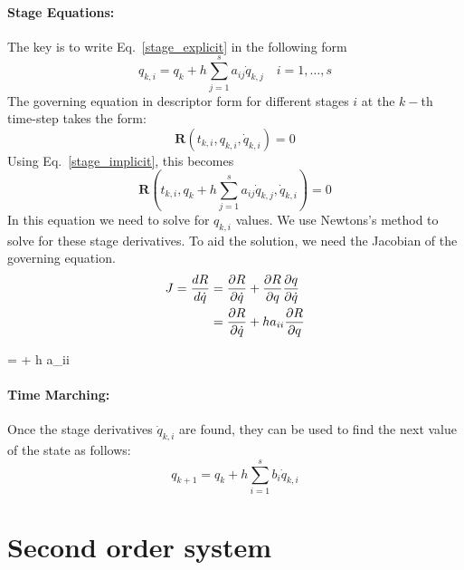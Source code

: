 \documentclass[pdftex,11pt,letter]{article}
\begin{document}
\paragraph{Stage Equations:}
The key is to write Eq.~\ref{stage_explicit} in the following form
\begin{equation}\label{stage_implicit}
  q_{k,i} = q_{k} + h \sum_{j=1}^s a_{ij} \dot{q}_{k,j} \quad i = 1,\ldots,s 
\end{equation}
The governing equation in descriptor form for different stages $i$ at the $k-$th time-step takes the form:
\begin{equation}
  \mathbf{R}\left(t_{k,i}, q_{k,i}, \dot{q}_{k,i}\right) = 0
\end{equation}
Using Eq.~\eqref{stage_implicit}, this becomes
\begin{equation}
  \mathbf{R}\left(t_{k,i}, q_k + h \sum_{j=1}^s a_{ij}\dot{q}_{k,j}, \dot{q}_{k,i}\right) = 0
\end{equation}
In this equation we need to solve for $q_{k,i}$ values. We use
Newtons's method to solve for these stage derivatives. To aid the
solution, we need the Jacobian of the governing equation.
\begin{equation}
  \begin{split}
    J = \dfrac{d R}{d \dot{q}} & = \dfrac{\partial R}{\partial \dot{q}} + \dfrac{\partial R}{\partial {q}}  \dfrac{\partial {q}}{\partial \dot{q}} \\
  & =  \dfrac{\partial R}{\partial \dot{q}} + h a_{ii} \dfrac{\partial R}{\partial q}\\
  \end{split}
\end{equation}

\beq
{} =  + h a_{ii} 
\eeq
  

\paragraph{Time Marching:}

Once the stage derivatives $\dot{q}_{k,i}$ are found, they can be used
to find the next value of the state as follows:
\begin{equation}
  q_{k+1} = q_{k} + h \sum_{i=1}^s b_i \dot{q}_{k,i}
\end{equation}

\section{Second order system}
\end{document}
